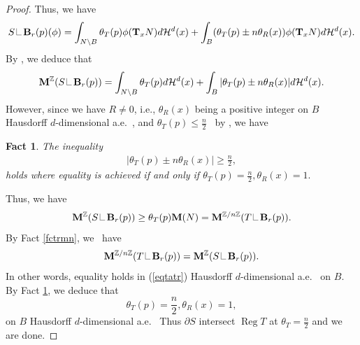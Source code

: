 \documentclass[11pt,a4paper]{amsart}
\numberwithin{equation}{section}
\newcommand{\reg}{\operatorname{Reg}}
\newcommand{\hm}{\mathcal{H}}
\newcommand{\ta}{\theta}
\newcommand\res{\mathop{\hbox{\vrule height 7pt width .3pt depth 0pt
			\vrule height .3pt width 5pt depth 0pt}}\nolimits}
\newcommand{\ms}{\mathbf{M}}
\newcommand{\T}{\mathbf{T}}
\newcommand{\br}{\mathbf{B}_r}
\newcommand{\pd}{\partial}
\newcommand{\Z}{\mathbb{Z}}
\theoremstyle{plain}
\newtheorem{fact}{Fact}[subsection]
\theoremstyle{definition}
\numberwithin{equation}{subsection}
\begin{document}
\begin{proof}
		Thus, we have
		\begin{align*}
			S\res \br(p)(\phi)=\int_{N\setminus B}\ta_T(p) \phi(\T_xN)d\hm^d(x)+\int_{B} (\ta_T(p)\pm n\ta_R(x))\phi(\T_xN)d\hm^d(x).
		\end{align*} 
		By \cite[Section 4.1.28]{HF}, we deduce that
		\begin{align*}
			\ms^{\Z}(S\res \br(p))=\int_{N\setminus B}\ta_T(p)d\hm^d(x)+\int_B |\ta_T(p)\pm n\ta_R(x)|d\hm^d(x).
		\end{align*}
		However, since we have $R\not=0$, i.e., $\ta_R(x)$ being a positive integer on $B$ Hausdorff $d$-dimensional a.e.~, and $\ta_T(p)\le \frac{n}{2}$  by \cite[page 430]{HF}, we have 
		\begin{fact}\label{fctdstin}
			The inequality		\begin{align}\label{eqtatr}
				|\ta_T(p)\pm n\ta_R(x)|\ge \frac{n}{2},
			\end{align}holds
			where equality is achieved if and only if $\ta_T(p)=\frac{n}{2},\ta_R(x)=1.$
		\end{fact}	
		Thus, we have
		\begin{align*}
			\ms^{\Z}(S\res \br(p))\ge \ta_T(p) \ms(N)=\ms^{\Z/n\Z}(T\res \br(p)). 
		\end{align*} By Fact \ref{fctrmn}, we  have\begin{align*}
			\ms^{\Z/n\Z}(T\res \br(p))=	\ms^{\Z}(S\res \br(p)). 
		\end{align*}
		In other words, equality holds in (\ref{eqtatr}) Hausdorff $d$-dimensional a.e.~ on $B.$ By Fact \ref{fctdstin}, we deduce that
		$$\ta_T(p)=\frac{n}{2},\ta_R(x)=1,$$ on $B$ Hausdorff $d$-dimensional a.e.~ Thus $\pd S$ intersect $\reg T$ at $\ta_T=\frac{n}{2}$ and we are done.
	\end{proof} 
\end{document}
